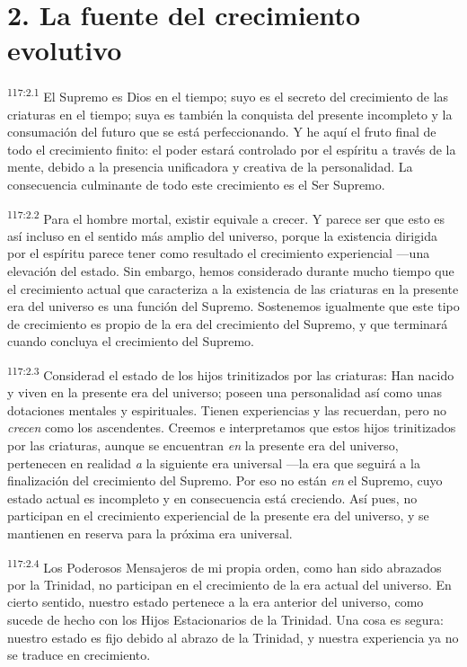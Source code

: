 \section*{2. La fuente del crecimiento evolutivo}
\par
\textsuperscript{117:2.1} El Supremo es Dios en el tiempo; suyo es el secreto del crecimiento de las criaturas en el tiempo; suya es también la conquista del presente incompleto y la consumación del futuro que se está perfeccionando. Y he aquí el fruto final de todo el crecimiento finito: el poder estará controlado por el espíritu a través de la mente, debido a la presencia unificadora y creativa de la personalidad. La consecuencia culminante de todo este crecimiento es el Ser Supremo.

\par
\textsuperscript{117:2.2} Para el hombre mortal, existir equivale a crecer. Y parece ser que esto es así incluso en el sentido más amplio del universo, porque la existencia dirigida por el espíritu parece tener como resultado el crecimiento experiencial ---una elevación del estado. Sin embargo, hemos considerado durante mucho tiempo que el crecimiento actual que caracteriza a la existencia de las criaturas en la presente era del universo es una función del Supremo. Sostenemos igualmente que este tipo de crecimiento es propio de la era del crecimiento del Supremo, y que terminará cuando concluya el crecimiento del Supremo.

\par
\textsuperscript{117:2.3} Considerad el estado de los hijos trinitizados por las criaturas: Han nacido y viven en la presente era del universo; poseen una personalidad así como unas dotaciones mentales y espirituales. Tienen experiencias y las recuerdan, pero no \textit{crecen} como los ascendentes. Creemos e interpretamos que estos hijos trinitizados por las criaturas, aunque se encuentran \textit{en} la presente era del universo, pertenecen en realidad \textit{a} la siguiente era universal ---la era que seguirá a la finalización del crecimiento del Supremo. Por eso no están \textit{en} el Supremo, cuyo estado actual es incompleto y en consecuencia está creciendo. Así pues, no participan en el crecimiento experiencial de la presente era del universo, y se mantienen en reserva para la próxima era universal.

\par
\textsuperscript{117:2.4} Los Poderosos Mensajeros de mi propia orden, como han sido abrazados por la Trinidad, no participan en el crecimiento de la era actual del universo. En cierto sentido, nuestro estado pertenece a la era anterior del universo, como sucede de hecho con los Hijos Estacionarios de la Trinidad. Una cosa es segura: nuestro estado es fijo debido al abrazo de la Trinidad, y nuestra experiencia ya no se traduce en crecimiento.

